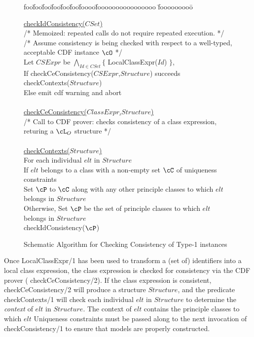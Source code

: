 \begin{figure}[htbp]
\longline
{\sf
\begin{tabbing}
foo\=foo\=foo\=foo\=foo\=foo\=foooo\=foooooooooooooooo \=fooooooooo\=\kill

\> \underline{checkIdConsistency($CSet$)}  \\
\> \> 	{\rm /* Memoized: repeated calls do
		not require repeated execution.  */ }\\
\> \> 	{\rm /* Assume consistency is being checked with respect to a
		well-typed, acceptable CDF instance $\cO$ */} \\
\> \> 	Let $CSExpr$ be $\bigwedge_{Id \in CSet} \{$ 
			LocalClassExpr($Id$) $\}$,  \\
\> \> 	If checkCeConsistency($CSExpr$,$Structure$) succeeds  \\
\> \> \> 	    checkContexts($Structure$) \\
\> \>     Else emit cdf warning and abort \\
\\
\> \underline{checkCeConsistency($ClassExpr$,$Structure$)} \\
\> \> {\rm /*  Call to CDF prover: checks consistency of a class
	         expression, returing a $\cL_O$ structure */} \\
\\
\> \underline{checkContexts($Structure$)}  \\
\> \> For each individual $elt$ in $Structure$ \\
\> \> \> If $elt$ belongs to a class with a non-empty set $\cC$ of
			uniqueness constraints \\
\> \> \> \> Set $\cP$ to $\cC$ along with any other principle classes to
		which  $elt$ belongs in $Structure$ \\ 
\> \> \> Otherwise, Set $\cP$ be the set of 
		principle classes to which $elt$ belongs in $Structure$ \\ 
\> \> \> checkIdConsistency($\cP$) \\
\end{tabbing}
}
\caption{Schematic Algorithm for Checking Consistency of Type-1 instances}
\label{fig:type1cc}
\longline
\end{figure}

Once {\sf LocalClassExpr/1} has been used to transform a (set of)
identifiers into a local class expression, the class expression is
checked for consistency via the CDF prover ({\sf
checkCeConsistency/2}).  If the class expression is consistent, {\sf
checkCeConsistency/2} will produce a structure $Structure$, and the
predicate {\sf checkContexts/1} will check each individual $elt$ in
$Structure$ to determine the {\em context} of $elt$ in $Structure$.
The context of $elt$ contains the principle classes to which $elt$
Uniqueness constraints must be passed along to the next invocation of
{\sf checkConsistency/1} to ensure that models are properly
constructed.

